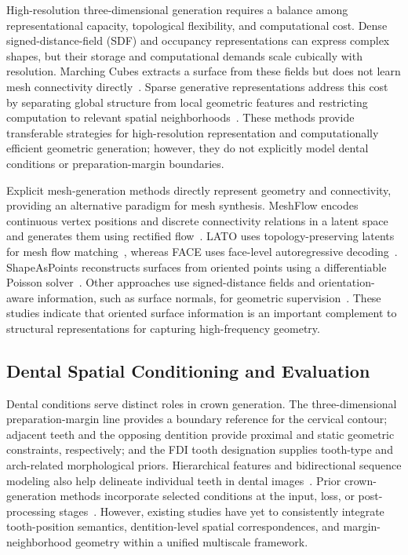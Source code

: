 \documentclass[preprint,review,12pt]{elsarticle}
\begin{document}
\hspace{2em}High-resolution three-dimensional generation requires a balance among representational capacity, topological flexibility, and computational cost. Dense signed-distance-field (SDF) and occupancy representations can express complex shapes, but their storage and computational demands scale cubically with resolution. Marching Cubes extracts a surface from these fields but does not learn mesh connectivity directly~\cite{Lorensen1987MarchingCubes}. Sparse generative representations address this cost by separating global structure from local geometric features and restricting computation to relevant spatial neighborhoods~\cite{li2026pixal3d}. These methods provide transferable strategies for high-resolution representation and computationally efficient geometric generation; however, they do not explicitly model dental conditions or preparation-margin boundaries.

\hspace{2em}Explicit mesh-generation methods directly represent geometry and connectivity, providing an alternative paradigm for mesh synthesis. MeshFlow encodes continuous vertex positions and discrete connectivity relations in a latent space and generates them using rectified flow~\cite{Li_2026_CVPR}. LATO uses topology-preserving latents for mesh flow matching~\cite{Zhao2026LATO}, whereas FACE uses face-level autoregressive decoding~\cite{Wang2026FACE}. ShapeAsPoints reconstructs surfaces from oriented points using a differentiable Poisson solver~\cite{Peng2021ShapeAsPoints}. Other approaches use signed-distance fields and orientation-aware information, such as surface normals, for geometric supervision~\cite{li2025triposg,Ye2025Hi3DGen}. These studies indicate that oriented surface information is an important complement to structural representations for capturing high-frequency geometry.

\subsection{Dental Spatial Conditioning and Evaluation}\label{subsec2_3}

\hspace{2em}Dental conditions serve distinct roles in crown generation. The three-dimensional preparation-margin line provides a boundary reference for the cervical contour; adjacent teeth and the opposing dentition provide proximal and static geometric constraints, respectively; and the FDI tooth designation supplies tooth-type and arch-related morphological priors. Hierarchical features and bidirectional sequence modeling also help delineate individual teeth in dental images~\cite{zhao2026innovative}. Prior crown-generation methods incorporate selected conditions at the input, loss, or post-processing stages~\cite{Wei2026MADCrowner,Yang2025DCrownFormerPlus,Wei2025VBCD}. However, existing studies have yet to consistently integrate tooth-position semantics, dentition-level spatial correspondences, and margin-neighborhood geometry within a unified multiscale framework.
\end{document}

